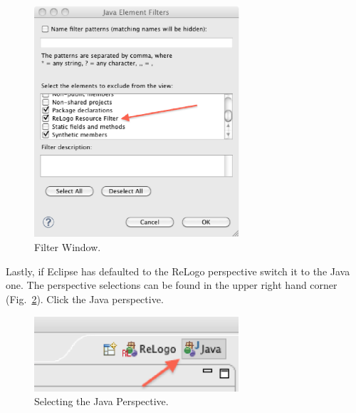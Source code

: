 \documentclass[11pt]{amsart}
\begin{document}
\begin{figure}[h]
\begin{center}
\vspace{.2in}
\centerline {
\includegraphics[width=3in]{figs/filter_window.eps}
}
\caption{Filter Window.}
\label{fig:filter2}
\end{center}
\end{figure}

Lastly, if Eclipse has defaulted to the ReLogo perspective switch it to the Java one. The perspective selections can be found in the upper right hand corner (Fig.~\ref{fig:javap}). Click the Java perspective.

\begin{figure}[h]
\begin{center}
\vspace{.2in}
\centerline {
\includegraphics[width=3in]{figs/perspectives.eps}
}
\caption{Selecting the Java Perspective.}
\label{fig:javap}
\end{center}
\end{figure}
\end{document}
